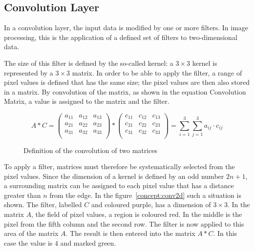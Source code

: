 {	
	\subsection*{Convolution Layer}\label{subsec:conv2d}
	
	In a convolution layer, the input data is modified by one or more filters. In image processing, this is the application of a defined set of filters to two-dimensional data.
	
	The size of this filter is defined by the so-called kernel: a $3 \times 3$ kernel is represented by a $3 \times 3$ matrix. In order to be able to apply the filter, a range of pixel values is defined that has the same size; the pixel values are then also stored in a matrix. By convolution of the matrix, as shown in the equation Convolution Matrix, a value is assigned to the matrix and the filter. 
	
	
	\begin{figure}
		
		$$A \ast C 
		=
		\left(
		\begin{matrix}
			a_{11} & a_{12} & a_{13}\\
			a_{21} & a_{22} & a_{23}\\
			a_{31} & a_{32} & a_{33}\\
		\end{matrix}
		\right)
		\ast
		\left(
		\begin{matrix}
			c_{11} & c_{12} & c_{13}\\
			c_{21} & c_{22} & c_{23}\\
			c_{31} & c_{32} & c_{33}\\
		\end{matrix}
		\right)
		= 
		\sum_{i=1}^3\sum_{j=1}^3  a_{ij} \cdot c_{ij}
		$$
		
		\caption{Definition of the convolution of two matrices}\label{concept:FaltungMatrix}
		
	\end{figure}
	
	To apply a filter, matrices must therefore be systematically selected from the pixel values. Since the dimension of a kernel is defined by an odd number $2n+1$, a surrounding matrix can be assigned to each pixel value that has a distance greater than $n$ from the edge. In the figure~\ref{concept:conv2d} such a situation is shown. The filter, labelled $C$ and coloured purple, has a dimension of $3 \times 3$. In the matrix $A$, the field of pixel values, a region is coloured red. In the middle is the pixel from the fifth column and the second row. The filter is now applied to this area of the matrix $A$. The result is then entered into the matrix $A\ast C$. In this case the value is $4$ and marked green.
	
}
